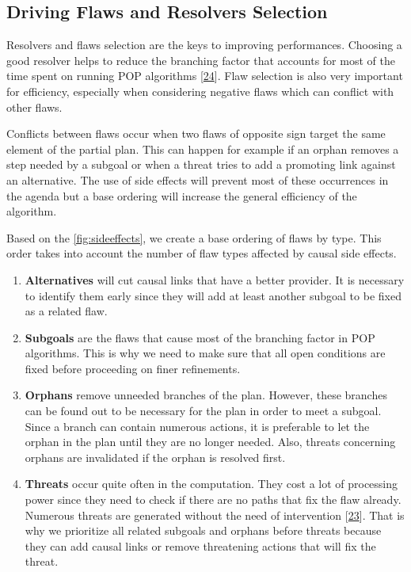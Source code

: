 \subsection{Driving Flaws and Resolvers Selection}\label{sec:selection}

Resolvers and flaws selection are the keys to improving performances.
Choosing a good resolver helps to reduce the branching factor that
accounts for most of the time spent on running POP algorithms
{[}\protect\hyperlink{ref-kambhampatiux5fdesignux5f1994}{24}{]}. Flaw
selection is also very important for efficiency, especially when
considering negative flaws which can conflict with other flaws.

Conflicts between flaws occur when two flaws of opposite sign target the
same element of the partial plan. This can happen for example if an
orphan removes a step needed by a subgoal or when a threat tries to add
a promoting link against an alternative. The use of side effects will
prevent most of these occurrences in the agenda but a base ordering will
increase the general efficiency of the algorithm.

Based on the \cref{fig:sideeffects}, we create a base ordering of flaws
by type. This order takes into account the number of flaw types affected
by causal side effects.

\begin{enumerate}
\def\labelenumi{\arabic{enumi}.}
\tightlist
\item
  \textbf{Alternatives} will cut causal links that have a better
  provider. It is necessary to identify them early since they will add
  at least another subgoal to be fixed as a related flaw.
\item
  \textbf{Subgoals} are the flaws that cause most of the branching
  factor in POP algorithms. This is why we need to make sure that all
  open conditions are fixed before proceeding on finer refinements.
\item
  \textbf{Orphans} remove unneeded branches of the plan. However, these
  branches can be found out to be necessary for the plan in order to
  meet a subgoal. Since a branch can contain numerous actions, it is
  preferable to let the orphan in the plan until they are no longer
  needed. Also, threats concerning orphans are invalidated if the orphan
  is resolved first.
\item
  \textbf{Threats} occur quite often in the computation. They cost a lot
  of processing power since they need to check if there are no paths
  that fix the flaw already. Numerous threats are generated without the
  need of intervention
  {[}\protect\hyperlink{ref-peotux5fthreatremovalux5f1993}{23}{]}. That
  is why we prioritize all related subgoals and orphans before threats
  because they can add causal links or remove threatening actions that
  will fix the threat.
\end{enumerate}

